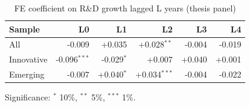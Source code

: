 \begin{table}[htbp]
\centering\small
\caption{FE coefficient on R\&D growth lagged L years (thesis panel)}
\label{tab:lags}
\begin{tabular}{lrrrrr}
\toprule
Sample & L0 & L1 & L2 & L3 & L4 \\
\midrule
All & -0.009 & +0.035 & +0.028$^{**}$ & -0.004 & -0.019 \\
Innovative & -0.096$^{***}$ & -0.029$^{*}$ & +0.007 & +0.040 & +0.001 \\
Emerging & -0.007 & +0.040$^{*}$ & +0.034$^{***}$ & -0.004 & -0.022 \\
\bottomrule
\end{tabular}
\par\footnotesize Significance: $^{*}$ 10\%, $^{**}$ 5\%, $^{***}$ 1\%.
\end{table}
